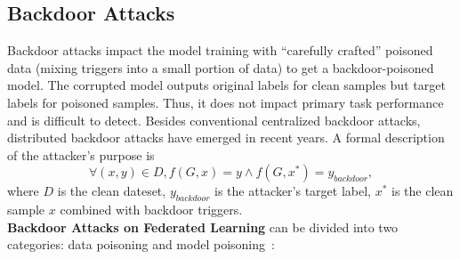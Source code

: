 \subsection{Backdoor Attacks}
Backdoor attacks impact the model training with ``carefully crafted'' poisoned data (mixing triggers into a small portion of data) to get a backdoor-poisoned model. The corrupted model outputs original labels for clean samples but target labels for poisoned samples. Thus, it does not impact primary task performance and is difficult to detect. Besides conventional centralized backdoor attacks, distributed backdoor attacks have emerged in recent years. A formal description of the attacker's purpose is
\begin{equation}
\forall \left ( x,y \right ) \in D, f\left (  G,x\right ) = y \wedge f\left (  G,x^{*} \right ) = y_{backdoor},
\end{equation}
where $D$ is the clean dateset, $ y_{backdoor} $ is the attacker's target label, $x^{*}$ is the clean sample $x$ combined with backdoor triggers.\\
\textbf{Backdoor Attacks on Federated Learning} can be divided into two categories: data poisoning and model poisoning~\cite{federatedopen}:
